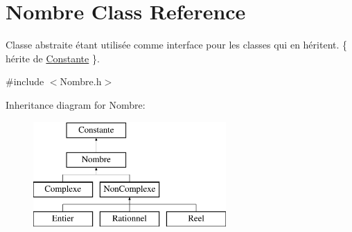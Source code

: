 \hypertarget{classNombre}{\section{\-Nombre \-Class \-Reference}
\label{classNombre}
}


\-Classe abstraite étant utilisée comme interface pour les classes qui en héritent. \{ hérite de \hyperlink{classConstante}{\-Constante} \}.  




{\ttfamily \#include $<$\-Nombre.\-h$>$}

\-Inheritance diagram for \-Nombre\-:\begin{figure}[H]
\begin{center}
\leavevmode
\includegraphics[height=4.000000cm]{classNombre}
\end{center}
\end{figure}
